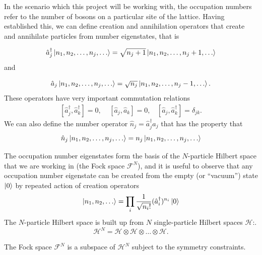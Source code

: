 \documentclass[a4paper,10pt]{article}
\begin{document}
In the scenario which this project will be working with, the occupation numbers refer to the number of bosons on a particular site of the lattice.
Having established this, we can define creation and annihilation operators that create and annihilate particles from number eigenstates, that is

\begin{equation}
 \hat{a}_{j}^{\dagger}\ket{n_1,n_2,\dots,n_{j},\dots}=\sqrt{n_j+1}\ket{n_1,n_2,\dots,n_{j}+1,\dots}
\end{equation}
and 

\begin{equation}
 \hat{a}_{j}\ket{n_1,n_2,\dots,n_{j},\dots}=\sqrt{n_j}\ket{n_1,n_2,\dots,n_{j}-1,\dots}.
\end{equation}
These operators have very important commutation relations
\begin{equation}
\begin{align*}
 [\hat{a}_{j}^{\dagger},\hat{a}_{k}^{\dagger}]=0, \ \ \ \ \ [\hat{a}_{j},\hat{a}_{k}]=0,\ \ \ \ [\hat{a}_{j},\hat{a}_{k}^{\dagger}]=\delta_{jk}.
 \end{align*}
\end{equation}
We can also define the number operator $\hat{n}_j=\hat{a}_{j}^{\dagger}\hat{a}_j$ that has the property that
\begin{equation}
 \hat{n}_{j}\ket{n_1,n_2,\dots,n_{j},\dots}=n_{j}\ket{n_1,n_2,\dots,n_{j},\dots}
\end{equation}

The occupation number eigenstates form the basis of the $N$-particle Hilbert space that we are working in (the Fock space $\mathcal{F}^N$), and it 
is useful to observe that any occupation number eigenstate can be created from the empty (or ``vacuum'') state $\ket{0}$ by repeated action of 
creation operators
\begin{equation}
 \ket{n_1,n_2,\dots}=\prod_i\frac{1}{\sqrt{n_i!}}(\hat{a}_i^{\dagger})^{n_i}\ket{0}
\end{equation}
The $N$-particle Hilbert space is built up from $N$ single-particle Hilbert spaces $\mathcal{H}$:.
\begin{equation}
 \mathcal{H}^N=\mathcal{H}\otimes \mathcal{H} \otimes \dots\otimes \mathcal{H}.
\end{equation}

The Fock space $\mathcal{F}^N$ is a subspace of $\mathcal{H}^N$ subject to the symmetry constraints.
\end{document}
